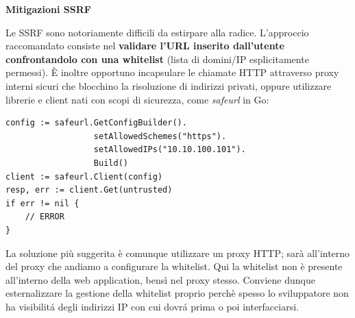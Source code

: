\textbf{Mitigazioni SSRF}

Le SSRF sono notoriamente difficili da estirpare alla radice. L'approccio 
raccomandato consiste nel \textbf{validare l'URL inserito dall'utente 
confrontandolo con una whitelist} (lista di domini/IP esplicitamente permessi). 
È inoltre opportuno incapsulare le chiamate HTTP attraverso proxy interni 
sicuri che blocchino la risoluzione di indirizzi privati, oppure utilizzare 
librerie e client nati con scopi di sicurezza, come \textit{safeurl} in Go:

\begin{lstlisting}
config := safeurl.GetConfigBuilder().
                  setAllowedSchemes("https").
                  setAllowedIPs("10.10.100.101").
                  Build()
client := safeurl.Client(config)
resp, err := client.Get(untrusted)
if err != nil {
    // ERROR
}
\end{lstlisting}

La soluzione più suggerita è comunque utilizzare un proxy HTTP; sarà 
all'interno del proxy che andiamo a configurare la whitelist. Qui la 
whitelist non è presente all'interno della web application, bensì nel proxy 
stesso. Conviene dunque esternalizzare la gestione della whitelist proprio 
perchè spesso lo sviluppatore non ha visibilitá degli indirizzi IP con cui 
dovrá prima o poi interfacciarsi.